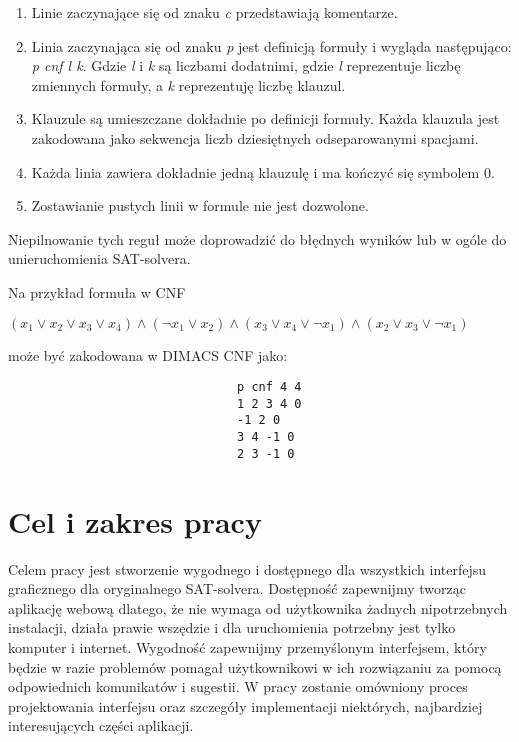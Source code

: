\documentclass[a4paper,12pt,oneside]{book}
\theoremstyle{definition}
\begin{document}
\begin{enumerate}
    \item Linie zaczynające się od znaku \textit{c} przedstawiają komentarze.
    \item Linia zaczynająca się od znaku \textit{p} jest definicją formuły i wygląda następująco: \textit{p cnf l k}. Gdzie \textit{l} i \textit{k} są liczbami dodatnimi, gdzie \textit{l} reprezentuje liczbę zmiennych formuły, a \textit{k} reprezentuję liczbę klauzul.
    \item Klauzule są umieszczane dokładnie po definicji formuły. Każda klauzula jest zakodowana jako sekwencja liczb dziesiętnych odseparowanymi spacjami.
    \item Każda linia zawiera dokładnie jedną klauzulę i ma kończyć się symbolem 0.
    \item Zostawianie pustych linii w formule nie jest dozwolone.
\end{enumerate}
Niepilnowanie tych reguł może doprowadzić do błędnych wyników lub w ogóle do unieruchomienia SAT-solvera.

Na przykład formuła w CNF

\begin{center}
    $(x_1 \lor x_2 \lor x_3 \lor x_4) \land (\neg x_1 \lor x_2) \land (x_3 \lor x_4 \lor \neg x_1) \land (x_2 \lor x_3 \lor \neg x_1)$ 
\end{center}

może być zakodowana w DIMACS CNF jako:

\begin{verbatim}
                                p cnf 4 4
                                1 2 3 4 0
                                -1 2 0
                                3 4 -1 0
                                2 3 -1 0
\end{verbatim}

\section{Cel i zakres pracy}

Celem pracy jest stworzenie wygodnego i dostępnego dla wszystkich interfejsu graficznego dla oryginalnego SAT-solvera. Dostępność zapewnijmy tworząc aplikację webową dlatego, że nie wymaga od użytkownika żadnych nipotrzebnych instalacji, działa prawie wszędzie i dla uruchomienia potrzebny jest tylko komputer i internet. Wygodność zapewnijmy przemyślonym interfejsem, który będzie w razie problemów pomagał użytkownikowi w ich rozwiązaniu za pomocą odpowiednich komunikatów i sugestii. W pracy zostanie omówniony proces projektowania interfejsu oraz szczegóły implementacji niektórych, najbardziej interesujących części aplikacji. 
\end{document}
